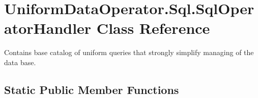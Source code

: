 \hypertarget{class_uniform_data_operator_1_1_sql_1_1_sql_operator_handler}{}\section{Uniform\+Data\+Operator.\+Sql.\+Sql\+Operator\+Handler Class Reference}
\label{class_uniform_data_operator_1_1_sql_1_1_sql_operator_handler}


Contains base catalog of uniform queries that strongly simplify managing of the data base.  


\subsection*{Static Public Member Functions}
